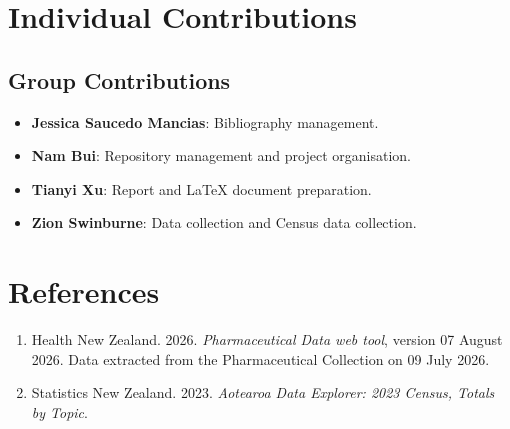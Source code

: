 \documentclass[11pt,a4paper]{report}
\begin{document}
\chapter{Individual Contributions}

\section{Group Contributions}

\begin{itemize}
    \item \textbf{Jessica Saucedo Mancias}: Bibliography management.
    \item \textbf{Nam Bui}: Repository management and project organisation.
    \item \textbf{Tianyi Xu}: Report and LaTeX document preparation.
    \item \textbf{Zion Swinburne}: Data collection and Census data collection.
\end{itemize}


\chapter{References}

\begin{enumerate}

\item Health New Zealand. 2026. \textit{Pharmaceutical Data web tool}, version 07 August 2026. Data extracted from the Pharmaceutical Collection on 09 July 2026.

\item Statistics New Zealand. 2023. \textit{Aotearoa Data Explorer: 2023 Census, Totals by Topic}.

\end{enumerate}
\end{document}
